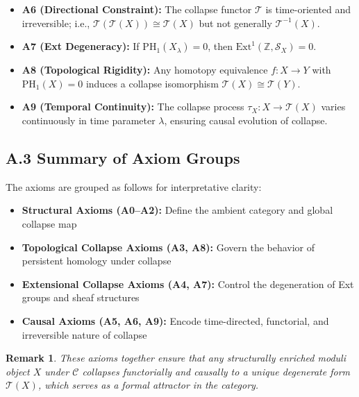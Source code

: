 \documentclass[11pt]{article}
\newtheorem{remark}[theorem]{Remark}
\begin{document}
\begin{itemize}
    \item \textbf{A6 (Directional Constraint):} The collapse functor $\mathcal{T}$ is time-oriented and irreversible;  
    i.e., $\mathcal{T}(\mathcal{T}(X)) \cong \mathcal{T}(X)$ but not generally $\mathcal{T}^{-1}(X)$.

    \item \textbf{A7 (Ext Degeneracy):} If $\mathrm{PH}_1(X_\lambda) = 0$, then $\mathrm{Ext}^1(\mathbb{Z}, \mathcal{S}_X) = 0$.

    \item \textbf{A8 (Topological Rigidity):} Any homotopy equivalence $f: X \to Y$ with $\mathrm{PH}_1(X) = 0$  
    induces a collapse isomorphism $\mathcal{T}(X) \cong \mathcal{T}(Y)$.

    \item \textbf{A9 (Temporal Continuity):} The collapse process $\tau_X: X \rightarrow \mathcal{T}(X)$ varies continuously in time parameter $\lambda$,  
    ensuring causal evolution of collapse.
\end{itemize}

\subsection*{A.3 Summary of Axiom Groups}

The axioms are grouped as follows for interpretative clarity:

\begin{itemize}
    \item \textbf{Structural Axioms (A0–A2):} Define the ambient category and global collapse map
    \item \textbf{Topological Collapse Axioms (A3, A8):} Govern the behavior of persistent homology under collapse
    \item \textbf{Extensional Collapse Axioms (A4, A7):} Control the degeneration of Ext groups and sheaf structures
    \item \textbf{Causal Axioms (A5, A6, A9):} Encode time-directed, functorial, and irreversible nature of collapse
\end{itemize}

\begin{remark}
These axioms together ensure that any structurally enriched moduli object $X$ under $\mathcal{C}$  
collapses functorially and causally to a unique degenerate form $\mathcal{T}(X)$,  
which serves as a formal attractor in the category.
\end{remark}
\end{document}
